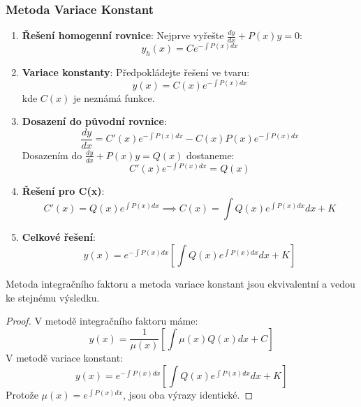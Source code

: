 \vspace{0.8\baselineskip}

\subsubsection{Metoda Variace Konstant}
\label{subsubsec:metoda-variance-konstant}

\begin{method}
\label{met:variace-konstant}
\begin{enumerate}
\item \textbf{Řešení homogenní rovnice}: Nejprve vyřešte $\frac{dy}{dx} + P(x)y = 0$:
\[
y_h(x) = Ce^{-\int P(x)dx}
\]

\item \textbf{Variace konstanty}: Předpokládejte řešení ve tvaru:
\[
y(x) = C(x)e^{-\int P(x)dx}
\]
kde $C(x)$ je neznámá funkce.

\item \textbf{Dosazení do původní rovnice}:
\[
\frac{dy}{dx} = C'(x)e^{-\int P(x)dx} - C(x)P(x)e^{-\int P(x)dx}
\]
Dosazením do $\frac{dy}{dx} + P(x)y = Q(x)$ dostaneme:
\[
C'(x)e^{-\int P(x)dx} = Q(x)
\]

\item \textbf{Řešení pro C(x)}:
\[
C'(x) = Q(x)e^{\int P(x)dx} \implies C(x) = \int Q(x)e^{\int P(x)dx}dx + K
\]

\item \textbf{Celkové řešení}:
\[
y(x) = e^{-\int P(x)dx}\left[\int Q(x)e^{\int P(x)dx}dx + K\right]
\]
\end{enumerate}
\end{method}

\vspace{0.8\baselineskip}

\begin{theorem}
Metoda integračního faktoru a metoda variace konstant jsou ekvivalentní a vedou ke stejnému výsledku.
\end{theorem}

\vspace{0.4\baselineskip}

\begin{proof}
V metodě integračního faktoru máme:
\[
y(x) = \frac{1}{\mu(x)}\left[\int \mu(x)Q(x)dx + C\right]
\]
V metodě variace konstant:
\[
y(x) = e^{-\int P(x)dx}\left[\int Q(x)e^{\int P(x)dx}dx + K\right]
\]
Protože $\mu(x) = e^{\int P(x)dx}$, jsou oba výrazy identické.
\end{proof}

